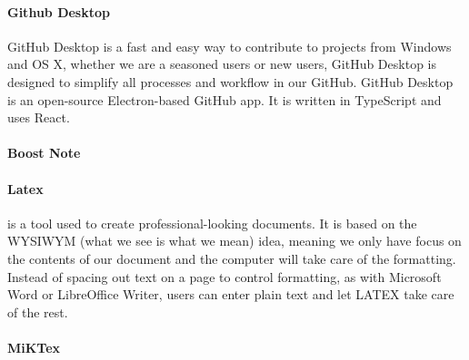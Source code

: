 \paragraph{Github Desktop}
GitHub Desktop is a fast and easy way to contribute to projects from Windows and OS X, whether we are a seasoned users or new users, GitHub Desktop is designed to simplify all processes and workflow in our GitHub. GitHub Desktop is an open-source Electron-based GitHub app. It is written in TypeScript and uses React.


\paragraph{Boost Note}


\paragraph{Latex}
\latex{} is a tool used to create professional-looking documents. It is based on the WYSIWYM (what we see is what we mean) idea, meaning we only have focus on the contents of our document and the computer will take care of the formatting. Instead of spacing out text on a page to control formatting, as with Microsoft Word or LibreOffice Writer, users can enter plain text and let LATEX take care of the rest.
\paragraph{MiKTex}

